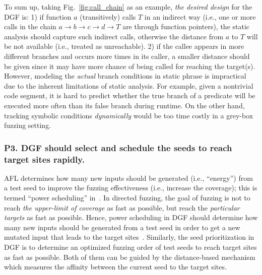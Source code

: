 To sum up, taking Fig.~\ref{fig:call_chain} as an example, \emph{the desired design} for the DGF is: 1) if function $a$ (transitively) calls $T$ in an indirect way (i.e., one or more calls in the chain $a\rightarrow\! b\!\rightarrow\! c\!\rightarrow\! d\!\rightarrow\! T$ are through function pointers), the static analysis should capture such indirect calls, otherwise the distance from $a$ to $T$ will be not available (i.e., treated as unreachable). 2) if the callee appears in more different branches and occurs more times in its caller, a smaller distance should be given since it may have more chance of being called for reaching the target(s). However, modeling the \emph{actual} branch conditions in static phrase is impractical due to the inherent limitations of static analysis. For example, given a nontrivial code segment, it is hard to predict whether the true branch of a predicate will be executed more often than its false branch during runtime. On the other hand, tracking symbolic conditions \emph{dynamically} would be too time costly in a grey-box fuzzing setting.
















\subsubsection{\textbf{P3}. DGF should select and schedule the seeds to reach target sites \textbf{rapidly}.} \label{subsec:p3}
 AFL determines how many new inputs should be generated (i.e., ``energy'') from a test seed to improve the fuzzing effectiveness (i.e., increase the coverage); this is termed ``power scheduling'' in~\cite{Bohme:2016:CGF,Bohme:2017:DGF}. In directed fuzzing, the goal of fuzzing is not to reach \emph{the upper-limit of coverage} as fast as possible, but reach the \emph{particular targets} as fast as possible. Hence, power scheduling in DGF should determine how many new inputs should be generated from a test seed in order to get a new mutated input that leads to the target sites~\cite{Bohme:2017:DGF}. Similarly, the seed prioritization in DGF is to determine an optimized fuzzing order of test seeds to reach target sites as fast as possible. Both of them can be guided by the distance-based mechanism which measures the affinity between the current seed to the target sites. 
 
